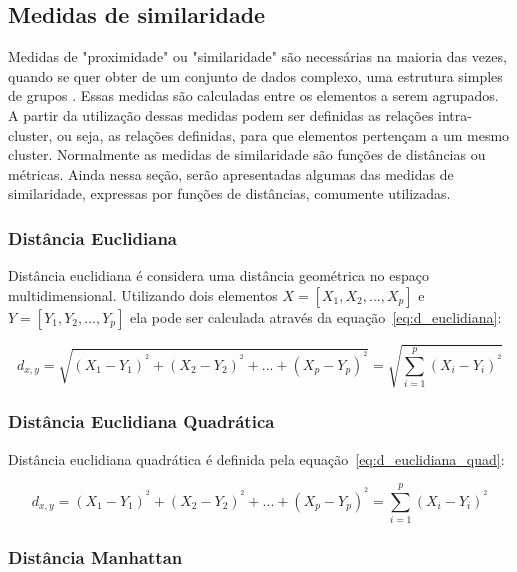 \subsection{Medidas de similaridade}

Medidas de "proximidade" ou "similaridade" são necessárias na maioria das vezes, quando se quer obter de um conjunto de dados complexo, uma estrutura simples de grupos \cite{kasznar2009tecnicas}. Essas medidas são calculadas entre os elementos a serem agrupados. A partir da utilização dessas medidas podem ser definidas as relações intra-cluster, ou seja, as relações definidas, para que elementos pertençam a um mesmo cluster. Normalmente as medidas de similaridade são funções de distâncias ou métricas. Ainda nessa seção, serão apresentadas algumas das medidas de similaridade, expressas por funções de distâncias, comumente utilizadas. 

\subsubsection{Distância Euclidiana}

Distância euclidiana é considera uma distância geométrica no espaço multidimensional. Utilizando dois elementos $X = [X_{1},X_{2}, ... ,X_{p}]$ e $Y = [Y_{1},Y_{2}, ... ,Y_{p}]$ ela pode ser calculada através da equação~\ref{eq:d_euclidiana}:

\begin{equation}\label{eq:d_euclidiana}
	d_{x,y} = \sqrt{(X_{1}-Y_{1})^{^{2}}+(X_{2}-Y_{2})^{^{2}}+...+(X_{p}-Y_{p})^{^{2}}} = \sqrt{\sum_{i=1}^{p}(X_{i}-Y_{i})^{^{2}}} \end{equation}

\subsubsection{Distância Euclidiana Quadrática}

Distância euclidiana quadrática é definida pela equação~\ref{eq:d_euclidiana_quad}:

\begin{equation}\label{eq:d_euclidiana_quad}
	d_{x,y} = (X_{1}-Y_{1})^{^{2}}+(X_{2}-Y_{2})^{^{2}}+...+(X_{p}-Y_{p})^{^{2}} =\sum_{i=1}^{p}(X_{i}-Y_{i})^{^{2}}
\end{equation}

\subsubsection{Distância Manhattan}

